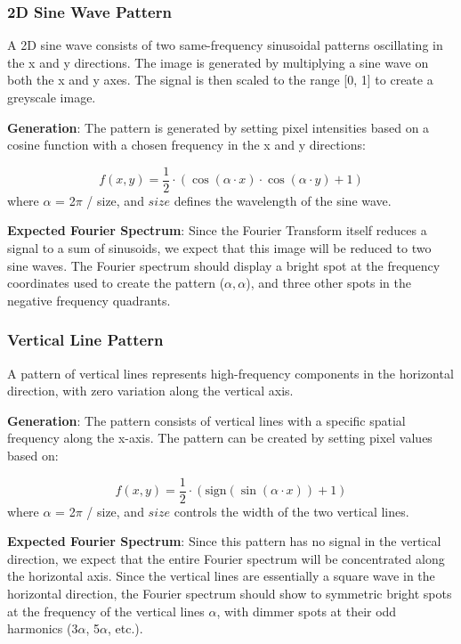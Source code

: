 \documentclass[a4paper,12pt]{article}
\begin{document}
\subsubsection{2D Sine Wave Pattern}
A 2D sine wave consists of two same-frequency sinusoidal patterns oscillating in the x and y directions. The image is generated by multiplying a sine wave on both the x and y axes. The signal is then scaled to the range [0, 1] to create a greyscale image.

\textbf{Generation}: The pattern is generated by setting pixel intensities based on a cosine function with a chosen frequency in the x and y directions:

\[
    f(x, y) = \frac{1}{2} \cdot \left(\cos(\alpha \cdot x) \cdot \cos(\alpha \cdot y) + 1\right)
\]
where \( \alpha \) = 2\(\pi\) / size, and \( size \) defines the wavelength of the sine wave.

\textbf{Expected Fourier Spectrum}: Since the Fourier Transform itself reduces a signal to a sum of sinusoids, we expect that this image will be reduced to two sine waves. The Fourier spectrum should display a bright spot at the frequency coordinates used to create the pattern (\( \alpha, \alpha \)), and three other spots in the negative frequency quadrants.

\subsubsection{Vertical Line Pattern}
A pattern of vertical lines represents high-frequency components in the horizontal direction, with zero variation along the vertical axis.

\textbf{Generation}: The pattern consists of vertical lines with a specific spatial frequency along the x-axis. The pattern can be created by setting pixel values based on:

\[
    f(x, y) = \frac{1}{2} \cdot \left( \text{sign}(\sin(\alpha \cdot x)) + 1 \right)
\]
where \( \alpha \) = 2\(\pi\) / size, and \( size \) controls the width of the two vertical lines.

\textbf{Expected Fourier Spectrum}: Since this pattern has no signal in the vertical direction, we expect that the entire Fourier spectrum will be concentrated along the horizontal axis. Since the vertical lines are essentially a square wave in the horizontal direction, the Fourier spectrum should show to symmetric bright spots at the frequency of the vertical lines \( \alpha \), with dimmer spots at their odd harmonics (3\(\alpha\), 5\(\alpha\), etc.).
\end{document}
